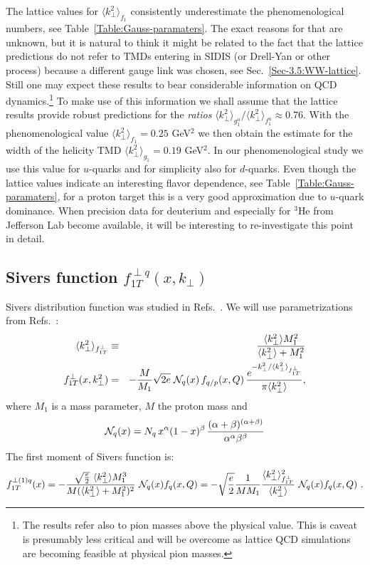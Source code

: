 \documentclass[a4paper,11pt]{article}
\newcommand{\ba}{\begin{eqnarray}}
\newcommand{\ea}{\end{eqnarray}}
\newcommand{\la}{\langle}
\newcommand{\ra}{\rangle}
\def\kperp{k_\perp}
\def\avkperp{\la \kperp^2 \ra}
\begin{document}
The lattice values for $\langle \kperp^2 \rangle_{f_1}$ consistently 
underestimate the phenomenological numbers, see 
Table~\ref{Table:Gauss-paramaters}.
The exact reasons for that are unknown, but it is natural to think it
might be related to the fact that the lattice predictions \cite{Hagler:2009mb}
do not refer to TMDs entering in SIDIS (or Drell-Yan or other process) 
because a different gauge link was chosen, see Sec.~\ref{Sec-3.5:WW-lattice}. 
Still one may expect these results to bear considerable information 
on QCD dynamics.\footnote{
	The results \cite{Hagler:2009mb} refer also to pion masses above the 
	physical value. This is caveat is presumably less critical and
	will be overcome as lattice QCD simulations are becoming feasible 
	at physical pion masses.}
To make use of this information we shall assume that the lattice results
\cite{Hagler:2009mb} provide robust predictions for the {\it ratios}
$\langle \kperp^2 \rangle_{g_1^u}/\langle \kperp^2 \rangle_{f_1^u}\approx 0.76$.
With the phenomenological value $\langle \kperp^2 \rangle_{f_1} = 0.25$ GeV$^2$ 
we then obtain the estimate for the width of the helicity TMD
$\langle \kperp^2 \rangle_{g_1} = 0.19$ GeV$^2$.
In our phenomenological study we use this value for $u$-quarks and for 
simplicity also for $d$-quarks. Even though the lattice values indicate 
an interesting flavor dependence, see Table~\ref{Table:Gauss-paramaters},
for a proton target this is a very good approximation due to $u$-quark 
dominance. When precision data for deuterium and especially for $^3$He
from Jefferson Lab become available, it will be interesting to 
re-investigate this point in detail.

\subsection{\boldmath Sivers function $f_{1T}^{\perp q}(x,k_\perp)$}
\label{App:basis-f1Tperp}

Sivers distribution function was studied in Refs.~\cite{Efremov:2004tp,Anselmino:2008sga,Anselmino:2011gs,Anselmino:2011ch, Aybat:2011ge,Gamberg:2013kla,Bacchetta:2011gx,Anselmino:2012aa,Sun:2013dya,Echevarria:2014xaa}. 
We will use parametrizations from  Refs.~\cite{Anselmino:2008sga,Anselmino:2011gs,Anselmino:2011ch}:
\ba
 \avkperp_{f_{1T}^\perp} &\equiv& \frac{\avkperp M_1^2}{\avkperp + M_1^2} \\
f_{1T}^{\perp}(x, \kperp^2)& =& - \frac {M}{M_1} \sqrt{2e} \;
{\cal N}_q(x) \, f_{q/p} (x,Q) \, \frac{e^{-\kperp^2/{\avkperp_{f_{1T}^\perp}}}}{\pi \avkperp} ,
\label{fiTp}
\ea
%
where $M_1$ is a mass parameter, $M$ the proton mass and
%
\ba
{\cal N}_q(x)= N_q \, x^{\alpha} (1-x)^{\beta} \,
\frac{(\alpha + \beta)^{(\alpha +\beta)}}
{\alpha^{\alpha} \beta^{\beta}}
 \ea
The first moment of Sivers function is:
\ba
f_{1T}^{\perp (1) q}(x)  = -\frac{\sqrt{\frac{e}{2}} \ \avkperp M_1^3}{M (\avkperp + M_1^2)^2}  \ {\cal N}_q(x)  f_q(x, Q) = -\sqrt{\frac{e}{2}} \frac{1}{M M_1}  \frac{\avkperp_{f_{1T}^\perp}^2}{\avkperp}    \ {\cal N}_q(x)  f_q(x, Q)
\label{siversm} \ .
\ea
\end{document}
